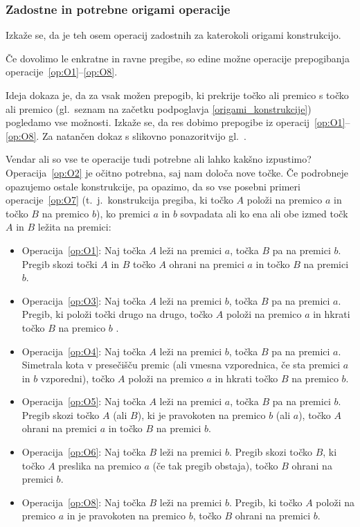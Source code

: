 \subsubsection{Zadostne in potrebne origami operacije}

Izkaže se, da je teh osem operacij zadostnih za katerokoli origami konstrukcijo.

\begin{izrek}
    \label{izr:op1do8}
    Če dovolimo le enkratne in ravne pregibe, so edine možne operacije prepogibanja operacije~\ref{op:O1}--\ref{op:O8}.
\end{izrek}

Ideja dokaza je, da za vsak možen prepogib, ki prekrije točko ali premico s točko ali premico (gl.\ seznam na začetku podpoglavja \ref{origami_konstrukcije}) pogledamo vse možnosti. Izkaže se, da res dobimo prepogibe iz operacij~\ref{op:O1}--\ref{op:O8}. Za natančen dokaz s slikovno ponazoritvijo gl.\ \cite[str.\ 24--26 (izrek 1.1)]{hull2020}.

Vendar ali so vse te operacije tudi potrebne ali lahko kakšno izpustimo? Operacija~\ref{op:O2} je očitno potrebna, saj nam določa nove točke. Če podrobneje opazujemo ostale konstrukcije, pa opazimo, da so vse posebni primeri operacije~\ref{op:O7} (t.\ j.\ konstrukcija pregiba, ki točko $A$ položi na premico $a$ in točko $B$ na premico $b$), ko premici $a$ in $b$ sovpadata ali ko ena ali obe izmed točk $A$ in $B$ ležita na premici:
\begin{itemize}
    \item Operacija~\ref{op:O1}: Naj točka $A$ leži na premici $a$, točka $B$ pa na premici $b$. Pregib skozi točki $A$ in $B$ točko $A$ ohrani na premici $a$ in točko $B$ na premici $b$.
    \item Operacija~\ref{op:O3}: Naj točka $A$ leži na premici $b$, točka $B$ pa na premici $a$. Pregib, ki položi točki drugo na drugo, točko $A$ položi na premico $a$ in hkrati točko $B$ na premico $b$ .
    \item Operacija~\ref{op:O4}: Naj točka $A$ leži na premici $b$, točka $B$ pa na premici $a$. Simetrala kota v presečišču premic (ali vmesna vzporednica, če sta premici $a$ in $b$ vzporedni), točko $A$ položi na premico $a$ in hkrati točko $B$ na premico $b$.
    \item Operacija~\ref{op:O5}: Naj točka $A$ leži na premici $a$, točka $B$ pa na premici $b$. Pregib skozi točko $A$ (ali $B$), ki je pravokoten na premico $b$ (ali $a$), točko $A$ ohrani na premici $a$ in točko $B$ na premici $b$.
    \item Operacija~\ref{op:O6}: Naj točka $B$ leži na premici $b$. Pregib skozi točko $B$, ki točko $A$ preslika na premico $a$ (če tak pregib obstaja), točko $B$ ohrani na premici $b$.
    \item Operacija~\ref{op:O8}: Naj točka $B$ leži na premici $b$. Pregib, ki točko $A$ položi na premico $a$ in je pravokoten na premico $b$, točko $B$ ohrani na premici $b$.
\end{itemize}

